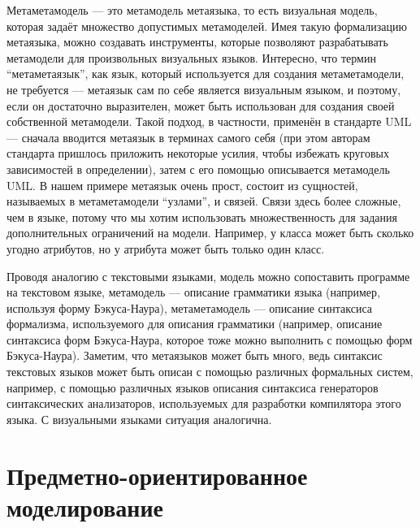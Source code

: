 Метаметамодель --- это метамодель метаязыка, то есть визуальная модель, 
которая задаёт множество допустимых метамоделей. Имея такую формализацию 
метаязыка, можно создавать инструменты, которые позволяют разрабатывать 
метамодели для произвольных визуальных языков. Интересно, что термин 
"`метаметаязык"', как язык, который используется для создания метаметамодели, 
не требуется --- метаязык сам по себе является визуальным языком, и поэтому, 
если он достаточно выразителен, может быть использован для создания своей 
собственной метамодели. Такой подход, в частности, применён в стандарте UML 
--- сначала вводится метаязык в терминах самого себя (при этом авторам стандарта 
пришлось приложить некоторые усилия, чтобы избежать круговых зависимостей в 
определении), затем с его помощью описывается метамодель UML. В нашем примере 
метаязык очень прост, состоит из сущностей, называемых в метаметамодели 
"`узлами"', и связей. Связи здесь более сложные, чем в языке, потому что мы 
хотим использовать множественность для задания дополнительных ограничений на 
модели. Например, у класса может быть сколько угодно атрибутов, но у атрибута 
может быть только один класс.

Проводя аналогию с текстовыми языками, модель можно сопоставить программе на 
текстовом языке, метамодель --- описание грамматики языка (например, используя 
форму Бэкуса-Наура), метаметамодель --- описание синтаксиса формализма, 
используемого для описания грамматики (например, описание синтаксиса форм 
Бэкуса-Наура, которое тоже можно выполнить с помощью форм Бэкуса-Наура). 
Заметим, что метаязыков может быть много, ведь синтаксис текстовых языков может 
быть описан с помощью различных формальных систем, например, с помощью различных 
языков описания синтаксиса генераторов синтаксических анализаторов, используемых 
для разработки компилятора этого языка. С визуальными языками ситуация 
аналогична.

\section{Предметно-ориентированное моделирование}
